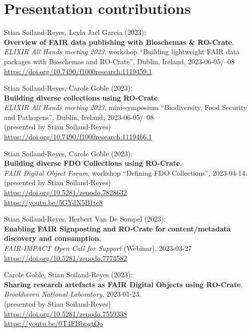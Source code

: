 \section{Presentation contributions}

Stian Soiland-Reyes, Leyla Jael Garcia (2023):\\
\textbf{Overview of FAIR data publishing with Bioschemas \& RO-Crate}.\\
\emph{ELIXIR All Hands meeting 2023}, workshop ``Building lightweight
FAIR data packages with Bioschemas and RO-Crate'', Dublin, Ireland,
2023-06-05/--08\\
\url{https://doi.org/10.7490/f1000research.1119459.1}

Stian Soiland-Reyes, Carole Goble (2023):\\
\textbf{Building diverse collections using RO-Crate}.\\
\emph{ELIXIR All Hands meeting 2023}, mini-symposium ``Biodiversity,
Food Security and Pathogens'', Dublin, Ireland, 2023-06-05/--08\\
(presented by Stian Soiland-Reyes)\\
\url{https://doi.org/10.7490/f1000research.1119466.1}

Stian Soiland-Reyes, Carole Goble (2023):\\
\textbf{Building diverse FDO Collections using RO-Crate}.\\
\emph{FAIR Digital Object Forum}, workshop
``Defining FDO Collections'', 2023-04-14.\\
(presented by Stian Soiland-Reyes)\\
\url{https://doi.org/10.5281/zenodo.7828632}\\
\url{https://youtu.be/5GYdN5B1tc8}

Stian Soiland-Reyes, Herbert Van De Sompel (2023):\\
\textbf{Enabling FAIR Signposting and RO-Crate for content/metadata discovery and consumption}.\\
\emph{FAIR-IMPACT Open Call for Support} (Webinar), 2023-03-27 \\
\url{https://doi.org/10.5281/zenodo.7774582}


Carole Goble, Stian Soiland-Reyes (2023):\\
\textbf{Sharing research artefacts as FAIR Digital Objects using RO-Crate}.\\
\emph{Brookhaven National Laboratory}, 2023-01-23.\\
(presented by Stian Soiland-Reyes)\\
\url{https://doi.org/10.5281/zenodo.7559338} \\
\url{https://youtu.be/0T4FBbpgtQo}

